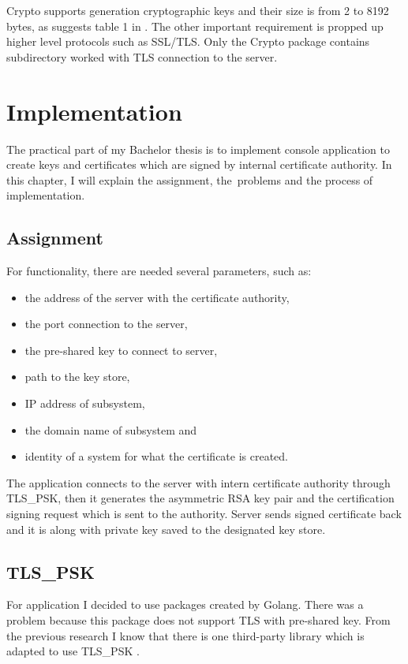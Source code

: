 \documentclass[
  twoside, 12pt, 
  printed, %
  notable,   %
  lof,     %
  lot,     %
]{fithesis3}
\begin{document}
Crypto supports generation cryptographic keys and their size is from 2 to 8192 bytes, as suggests 
table 1 in \cite{hinek2008security}. The other important requirement is propped up higher level 
protocols such as SSL/TLS. Only the Crypto package contains subdirectory worked with TLS connection 
to the server.

\chapter{Implementation}
The practical part of my Bachelor thesis is to implement console application to create keys and 
certificates which are signed by internal certificate authority. In this chapter, I will explain the 
assignment, the~problems and the process of implementation. 

\section{Assignment}
For functionality, there are needed several parameters, such as:
\begin{itemize}[leftmargin=2em,rightmargin=1em,itemsep=0.75\parskip,parsep=0em,topsep=0em,partopsep=0em]
\item the address of the server with the certificate authority,
\item the port connection to the server,
\item the pre-shared key to connect to server,
\item path to the key store,
\item IP address of subsystem,
\item the domain name of subsystem and 
\item identity of a system for what the certificate is created.
\end{itemize}
\vskip 0.1in
The application connects to the server with intern certificate authority through 
TLS\_PSK, then it generates the asymmetric RSA key pair and the certification signing 
request which is sent to the authority. Server sends signed certificate back and it is 
along with private key saved to the designated key store.

\section{TLS\_PSK}
For application I decided to use packages created by Golang. There was a problem 
because this package does not support TLS with pre-shared key. From the previous 
research I know that there is one third-party library which is adapted to use TLS\_PSK 
\cite{raff}. 
\end{document}
